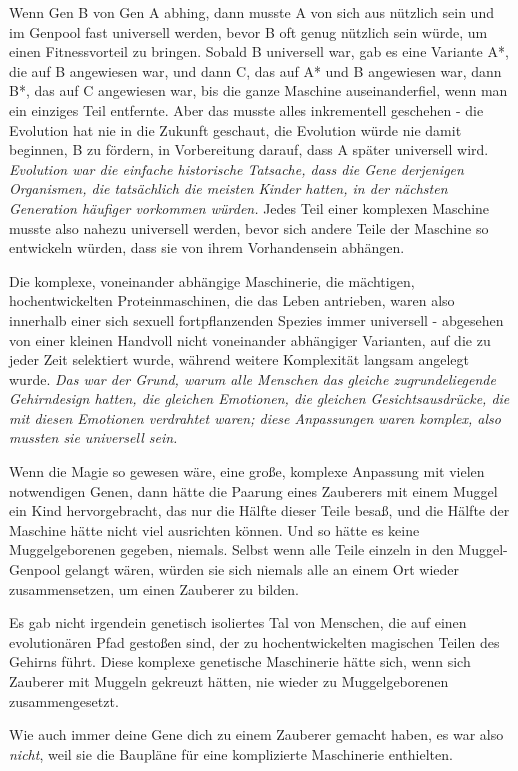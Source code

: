 Wenn Gen B von Gen A abhing, dann musste A von sich aus nützlich sein und im
Genpool fast universell werden, bevor B oft genug nützlich sein würde, um einen
Fitnessvorteil zu bringen. Sobald B universell war, gab es eine Variante A*, die
auf B angewiesen war, und dann C, das auf A* und B angewiesen war, dann B*, das
auf C angewiesen war, bis die ganze Maschine auseinanderfiel, wenn man ein
einziges Teil entfernte. Aber das musste alles inkrementell geschehen - die
Evolution hat nie in die Zukunft geschaut, die Evolution würde nie damit
beginnen, B zu fördern, in Vorbereitung darauf, dass A später universell wird.
\emph{Evolution war die einfache historische Tatsache, dass die Gene derjenigen
Organismen, die tatsächlich die meisten Kinder hatten, in der nächsten
Generation häufiger vorkommen würden.} Jedes Teil einer komplexen Maschine
musste also nahezu universell werden, bevor sich andere Teile der Maschine so
entwickeln würden, dass sie von ihrem Vorhandensein abhängen.

Die komplexe, voneinander abhängige Maschinerie, die mächtigen, hochentwickelten
Proteinmaschinen, die das Leben antrieben, waren also innerhalb einer sich
sexuell fortpflanzenden Spezies immer universell - abgesehen von einer kleinen
Handvoll nicht voneinander abhängiger Varianten, auf die zu jeder Zeit
selektiert wurde, während weitere Komplexität langsam angelegt wurde. \emph{Das
war der Grund, warum alle Menschen das gleiche zugrundeliegende Gehirndesign
hatten, die gleichen Emotionen, die gleichen Gesichtsausdrücke, die mit diesen
Emotionen verdrahtet waren; diese Anpassungen waren komplex, also mussten sie
universell sein.}

Wenn die Magie so gewesen wäre, eine große, komplexe Anpassung mit vielen
notwendigen Genen, dann hätte die Paarung eines Zauberers mit einem Muggel ein
Kind hervorgebracht, das nur die Hälfte dieser Teile besaß, und die Hälfte der
Maschine hätte nicht viel ausrichten können. Und so hätte es keine
Muggelgeborenen gegeben, niemals. Selbst wenn alle Teile einzeln in den
Muggel-Genpool gelangt wären, würden sie sich niemals alle an einem Ort wieder
zusammensetzen, um einen Zauberer zu bilden.

Es gab nicht irgendein genetisch isoliertes Tal von Menschen, die auf einen
evolutionären Pfad gestoßen sind, der zu hochentwickelten magischen Teilen des
Gehirns führt. Diese komplexe genetische Maschinerie hätte sich, wenn sich
Zauberer mit Muggeln gekreuzt hätten, nie wieder zu Muggelgeborenen
zusammengesetzt.

Wie auch immer deine Gene dich zu einem Zauberer gemacht haben, es war also
\emph{nicht}, weil sie die Baupläne für eine komplizierte Maschinerie
enthielten.

